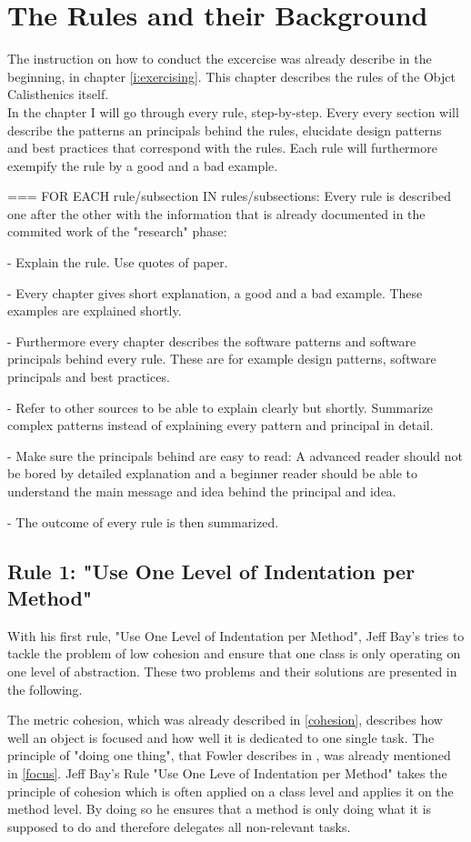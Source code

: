 \section{The Rules and their Background}
\label{d:background}
 The instruction on how to conduct the excercise was already describe in the beginning, in chapter \ref{i:exercising}. This chapter describes the rules of the Objct Calisthenics itself. \\
 In the chapter I will go through every rule, step-by-step. Every every section will describe the patterns an principals behind the rules, elucidate design patterns and best practices that correspond with the rules. Each rule will furthermore exempify the rule by a good and a bad example. 

=== FOR EACH rule/subsection IN rules/subsections: 
Every rule is described one after the other with the information that is already documented in the commited work of the "research" phase: 

 - Explain the rule. Use quotes of paper. 
 
 - Every chapter gives short explanation, a good and a bad example. These examples are explained shortly. 
 
 -  Furthermore every chapter describes the software patterns and software principals behind every rule. These are for example design patterns, software principals and best practices. 
 
 - Refer to other sources to be able to explain clearly but shortly. Summarize complex patterns instead of explaining every pattern and principal in detail. 
 
 - Make sure the principals behind are easy to read: A advanced reader should not be bored by detailed explanation and a beginner reader should be able to understand the main message and idea behind the principal and idea.
 
 - The outcome of every rule is then summarized.

\subsection{Rule 1: "Use One Level of Indentation per Method"}
\label{describe:rule1}
With his first rule, "Use One Level of Indentation per Method", Jeff Bay's tries to tackle the problem of low cohesion and ensure that one class is only operating on one level of abstraction. These two problems and their solutions are presented in the following. 

The metric cohesion, which was already described in \ref{cohesion}, describes how well an object is focused and how well it is dedicated to one single task. The principle of "doing one thing", that Fowler describes in \cite{cc}, was already mentioned in \ref{focus}. Jeff Bay's Rule "Use One Leve of Indentation per Method" takes the principle of cohesion which is often applied on a class level and applies it on the method level. By doing so he ensures that a method is only doing what it is supposed to do and therefore delegates all non-relevant tasks. \\

